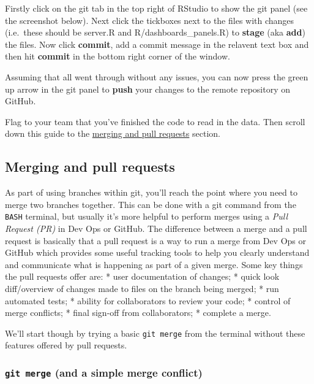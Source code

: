 \documentclass[
  12pt,
]{article}
\begin{document}
Firstly click on the git tab in the top right of RStudio to show the git
panel (see the screenshot below). Next click the tickboxes next to the
files with changes (i.e.~these should be server.R and
R/dashboards\_panels.R) to \textbf{stage} (aka \textbf{add}) the files.
Now click \textbf{commit}, add a commit message in the relavent text box
and then hit \textbf{commit} in the bottom right corner of the window.

Assuming that all went through without any issues, you can now press the
green up arrow in the git panel to \textbf{push} your changes to the
remote repository on GitHub.

Flag to your team that you've finished the code to read in the data.
Then scroll down this guide to the
\protect\hyperlink{merging-and-pull-requests}{merging and pull requests}
section.

\hypertarget{merging-and-pull-requests}{%
\subsection{Merging and pull requests}\label{merging-and-pull-requests}}

As part of using branches within git, you'll reach the point where you
need to merge two branches together. This can be done with a git command
from the \texttt{BASH} terminal, but usually it's more helpful to
perform merges using a \emph{Pull Request (PR)} in Dev Ops or GitHub.
The difference between a merge and a pull request is basically that a
pull request is a way to run a merge from Dev Ops or GitHub which
provides some useful tracking tools to help you clearly understand and
communicate what is happening as part of a given merge. Some key things
the pull requests offer are: * user documentation of changes; * quick
look diff/overview of changes made to files on the branch being merged;
* run automated tests; * ability for collaborators to review your code;
* control of merge conflicts; * final sign-off from collaborators; *
complete a merge.

We'll start though by trying a basic \texttt{git\ merge} from the
terminal without these features offered by pull requests.

\hypertarget{git-merge-and-a-simple-merge-conflict}{%
\subsubsection{\texorpdfstring{\texttt{git\ merge} (and a simple merge
conflict)}{git merge (and a simple merge conflict)}}\label{git-merge-and-a-simple-merge-conflict}}
\end{document}
